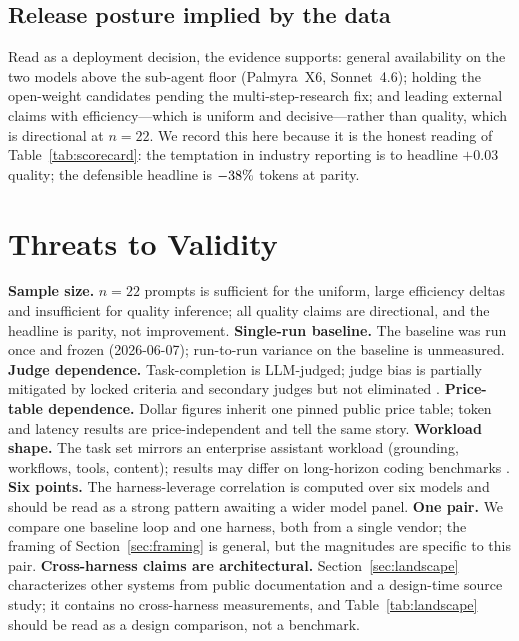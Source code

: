 \documentclass[11pt]{article}
\newcommand{\NP}{22}                    %
\newcommand{\FreezeDate}{2026-06-07}
\begin{document}
\subsection{Release posture implied by the data}

Read as a deployment decision, the evidence supports: general availability on the two models above the sub-agent floor (Palmyra~X6, Sonnet~4.6); holding the open-weight candidates pending the multi-step-research fix; and leading external claims with efficiency---which is uniform and decisive---rather than quality, which is directional at $n=\NP{}$. We record this here because it is the honest reading of Table~\ref{tab:scorecard}: the temptation in industry reporting is to headline $+0.03$ quality; the defensible headline is $-38\%{}$ tokens at parity.

\section{Threats to Validity}
\label{sec:threats}
\label{sec:limits}

\textbf{Sample size.} $n=\NP{}$ prompts is sufficient for the uniform, large efficiency deltas and insufficient for quality inference; all quality claims are directional, and the headline is parity, not improvement. \textbf{Single-run baseline.} The baseline was run once and frozen (\FreezeDate{}); run-to-run variance on the baseline is unmeasured. \textbf{Judge dependence.} Task-completion is LLM-judged; judge bias is partially mitigated by locked criteria and secondary judges but not eliminated \cite{judge}. \textbf{Price-table dependence.} Dollar figures inherit one pinned public price table; token and latency results are price-independent and tell the same story. \textbf{Workload shape.} The task set mirrors an enterprise assistant workload (grounding, workflows, tools, content); results may differ on long-horizon coding benchmarks \cite{swebench,sweagent}. \textbf{Six points.} The harness-leverage correlation is computed over six models and should be read as a strong pattern awaiting a wider model panel. \textbf{One pair.} We compare one baseline loop and one harness, both from a single vendor; the framing of Section~\ref{sec:framing} is general, but the magnitudes are specific to this pair. \textbf{Cross-harness claims are architectural.} Section~\ref{sec:landscape} characterizes other systems from public documentation and a design-time source study; it contains no cross-harness measurements, and Table~\ref{tab:landscape} should be read as a design comparison, not a benchmark.
\end{document}
